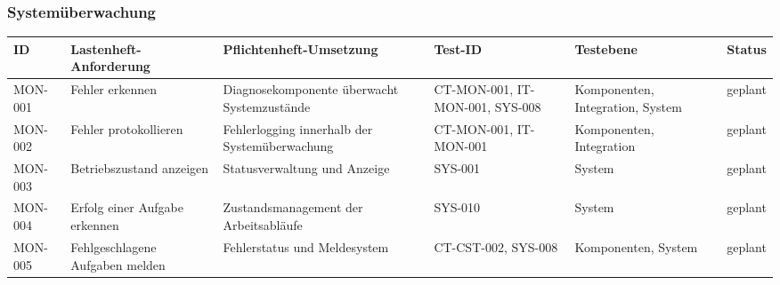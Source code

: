 \documentclass[
  a4paper,
  12pt,
  DIV=12,        %
  parskip=half,  %
  headings=small %
]{scrartcl}
\theoremstyle{definition}
\theoremstyle{definition}
\begin{document}
\newpage

\begin{landscape}
\subsubsection{Systemüberwachung}\label{systemuxfcberwachung-1}

\begin{longtable}[]{@{}
  >{\raggedright\arraybackslash}p{}
  >{\raggedright\arraybackslash}p{}
  >{\raggedright\arraybackslash}p{}
  >{\raggedright\arraybackslash}p{}
  >{\raggedright\arraybackslash}p{}
  >{\raggedright\arraybackslash}p{}@{}}
\toprule\noalign{}
\begin{minipage}[b]{\linewidth}\raggedright
ID
\end{minipage} & \begin{minipage}[b]{\linewidth}\raggedright
Lastenheft-Anforderung
\end{minipage} & \begin{minipage}[b]{\linewidth}\raggedright
Pflichtenheft-Umsetzung
\end{minipage} & \begin{minipage}[b]{\linewidth}\raggedright
Test-ID
\end{minipage} & \begin{minipage}[b]{\linewidth}\raggedright
Testebene
\end{minipage} & \begin{minipage}[b]{\linewidth}\raggedright
Status
\end{minipage} \\
\midrule\noalign{}
\endhead
\bottomrule\noalign{}
\endlastfoot
MON-001 & Fehler erkennen & Diagnosekomponente überwacht Systemzustände
& CT-MON-001, IT-MON-001, SYS-008 & Komponenten, Integration, System &
geplant \\
MON-002 & Fehler protokollieren & Fehlerlogging innerhalb der
Systemüberwachung & CT-MON-001, IT-MON-001 & Komponenten, Integration &
geplant \\
MON-003 & Betriebszustand anzeigen & Statusverwaltung und Anzeige &
SYS-001 & System & geplant \\
MON-004 & Erfolg einer Aufgabe erkennen & Zustandsmanagement der
Arbeitsabläufe & SYS-010 & System & geplant \\
MON-005 & Fehlgeschlagene Aufgaben melden & Fehlerstatus und Meldesystem
& CT-CST-002, SYS-008 & Komponenten, System & geplant \\
\end{longtable}
\end{landscape}
\end{document}

